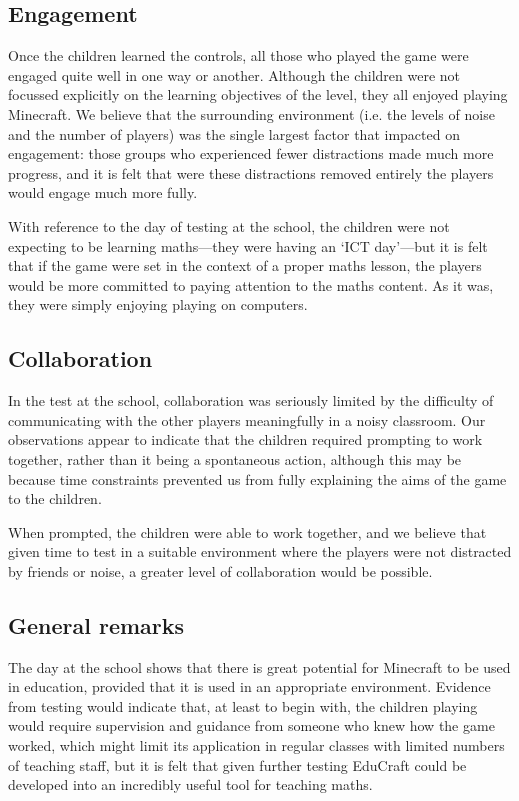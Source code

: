 \subsection{Engagement}
Once the children learned the controls, all those who played the game were engaged
quite well in one way or another. Although the children were not focussed
explicitly on the learning objectives of the level, they all enjoyed playing Minecraft.
We believe that the surrounding environment (i.e. the levels of noise and the number
of players) was the single largest factor that impacted on engagement: those groups
who experienced fewer distractions made much more progress, and it is felt that
were these distractions removed entirely the players would engage much more fully.

With reference to the day of testing at the school, the children were not expecting to
be learning maths---they were having an `ICT day'---but it is felt that if the
game were set in the context of a proper maths lesson, the players would be more
committed to paying attention to the maths content. As it was, they were simply
enjoying playing on computers.

\subsection{Collaboration}
In the test at the school, collaboration was seriously limited by the difficulty of
communicating with the other players meaningfully in a noisy classroom. Our
observations appear to indicate that the children required prompting to work
together, rather than it being a spontaneous action, although this may be because
time constraints prevented us from fully explaining the aims of the game to
the children.

When prompted, the children were able to work together, and we believe that given
time to test in a suitable environment where the players were not distracted
by friends or noise, a greater level of collaboration would be possible.

\subsection{General remarks}
The day at the school shows that there is great potential for Minecraft to be used
in education, provided that it is used in an appropriate environment. Evidence
from testing would indicate that, at least to begin with, the children playing
would require supervision and guidance from someone who knew how the game
worked, which might limit its application in regular classes with limited
numbers of teaching staff, but it is felt that given further testing EduCraft
could be developed into an incredibly useful tool for teaching maths.

